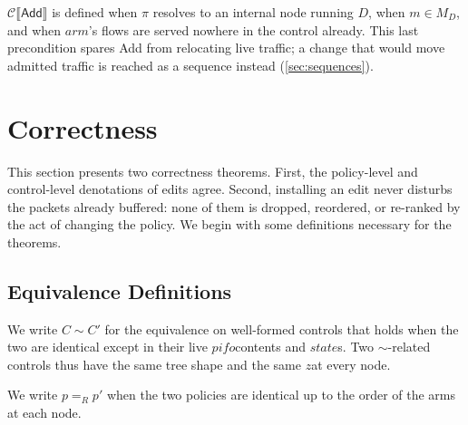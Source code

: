 \documentclass[sigplan,anonymous,review,nonacm]{acmart}
\newcommand{\push}{\ensuremath{\mathtt{push}}}
\newcommand{\pop}{\ensuremath{\mathtt{pop}}}
\newcommand{\csem}[1]{\mathcal{C}\llbracket #1 \rrbracket}
\newcommand{\eqR}{=_R}
\newcommand{\notation}[1]{\ensuremath{#1}\ifmmode\else\xspace\fi}
\newcommand{\pifo}{\notation{\mathit{pifo}}}
\newcommand{\zz}{\notation{\mathit{z}}}
\newcommand{\stt}{\notation{\mathit{state}}}
\newcommand{\arm}{\notation{\mathit{arm}}}
\newcommand{\disc}{\notation{D}}
\newcommand{\Add}{\textsf{Add}}
\begin{document}
\(\csem{\Add}\) is defined when \(\pi\) resolves to an internal node running \disc, when \(m \in M_{D}\), and when \arm's flows are served nowhere in the control already.
This last precondition spares \Add{} from relocating live traffic; a change that would move admitted traffic is reached as a sequence instead (\cref{sec:sequences}).


\section{Correctness}\label{sec:correctness}

This section presents two correctness theorems.
First, the policy-level and control-level denotations of edits agree.
Second, installing an edit never disturbs the packets already buffered: none of them is dropped, reordered, or re-ranked by the act of changing the policy.
%
We begin with some definitions necessary for the theorems.

\subsection{Equivalence Definitions}\label{sec:equivalences}

We write \(C \sim C'\) for the equivalence on well-formed controls that holds when the two are identical except in their live \pifo contents and \stt{}s.
Two \(\sim\)-related controls thus have the same tree shape and the same \zz at every node.

We write \(p \eqR p'\) when the two policies are identical up to the order of the arms at each node.
\end{document}
